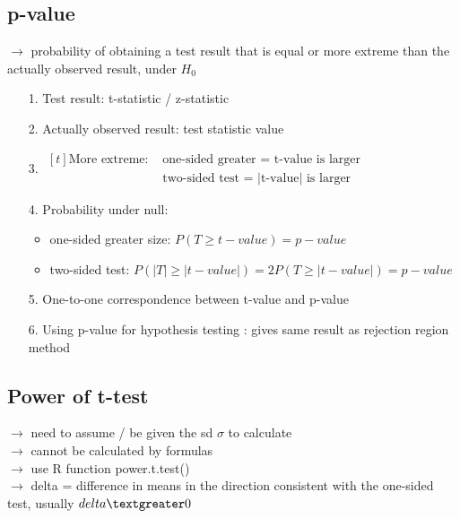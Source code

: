 \documentclass{article}
\begin{document}
\subsection{p-value}
$\rightarrow$ probability of obtaining a test result that is equal or more extreme than the actually observed result, under $H_0$ 
\begin{itemize}
    \item [1.] Test result: t-statistic / z-statistic
    \item[2.] Actually observed result: test statistic value
    \item[3.] $\begin{aligned}[t]
        \text{More extreme:} & \text{ one-sided greater = t-value is larger} \\
                             & \text{ two-sided test = |t-value| is larger}
    \end{aligned}$
    \item[4.] Probability under null:
    \begin{itemize}
        \item one-sided greater size: $P(T \geq t-value)=p-value$
        \item two-sided test: $P(|T| \geq |t-value|)=2P(T \geq |t-value|) = p-value$
    \end{itemize}
    \item[5.] One-to-one correspondence between t-value and p-value
    \item[6.] Using p-value for hypothesis testing : gives same result as rejection region method
\end{itemize}
\subsection{Power of t-test}
$\rightarrow$ need to assume / be given the sd $\sigma$ to calculate\\
$\rightarrow$ cannot be calculated by formulas\\
$\rightarrow$ use R function power.t.test()\\
$\rightarrow$ delta = difference in means in the direction consistent with the one-sided test, usually $delta \textgreater0$
\end{document}
